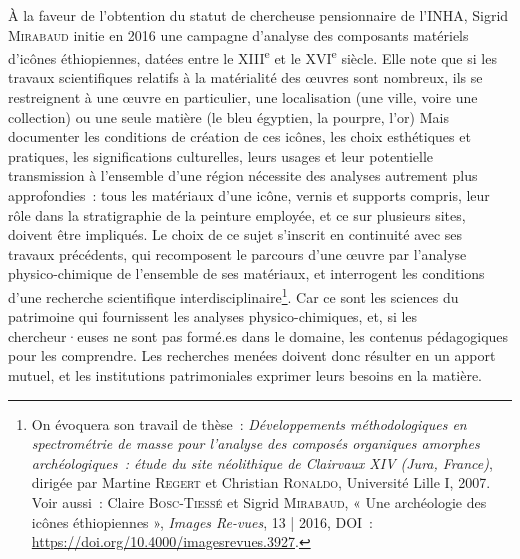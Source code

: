 \documentclass[a4paper,12pt, twoside]{book}
\begin{document}
À la faveur de l’obtention du statut de chercheuse pensionnaire de l’INHA, Sigrid \textsc{Mirabaud} initie en 2016 une campagne d’analyse des composants matériels d’icônes éthiopiennes, datées entre le XIII\textsuperscript{e} et le XVI\textsuperscript{e} siècle. Elle note que si les travaux scientifiques relatifs à la matérialité des œuvres sont nombreux, ils se restreignent à une œuvre en particulier, une localisation (une ville, voire une collection) ou une seule matière (le bleu égyptien, la pourpre, l’or) Mais documenter les conditions de création de ces icônes, les choix esthétiques et pratiques, les significations culturelles, leurs usages et leur potentielle transmission à l’ensemble d’une région nécessite des analyses autrement plus approfondies~: tous les matériaux d’une icône, vernis et supports compris, leur rôle dans la stratigraphie de la peinture employée, et ce sur plusieurs sites, doivent être impliqués. Le choix de ce sujet s’inscrit en continuité avec ses travaux précédents, qui recomposent le parcours d’une œuvre par l’analyse physico-chimique de l’ensemble de ses matériaux, et interrogent les conditions d’une recherche scientifique interdisciplinaire\footnote{On évoquera son travail de thèse~: \textit{Développements méthodologiques en spectrométrie de masse pour l'analyse des composés organiques amorphes archéologiques~: étude du site néolithique de Clairvaux XIV (Jura, France)}, dirigée par Martine \textsc{Regert} et Christian \textsc{Ronaldo}, Université Lille I, 2007. Voir aussi~: Claire \textsc{Bosc-Tiessé} et Sigrid \textsc{Mirabaud}, « Une archéologie des icônes éthiopiennes », \textit{Images Re-vues}, 13 | 2016, DOI~: \url{https://doi.org/10.4000/imagesrevues.3927}.}. Car ce sont les sciences du patrimoine qui fournissent les analyses physico-chimiques, et, si les chercheur·euses ne sont pas formé.es dans le domaine, les contenus pédagogiques pour les comprendre. Les recherches menées doivent donc résulter en un apport mutuel, et les institutions patrimoniales exprimer leurs besoins en la matière.
\end{document}
